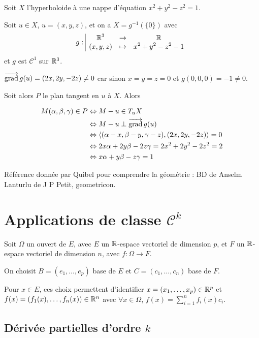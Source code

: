 \begin{exemple}
    Soit $X$ l'hyperboloide à une nappe d'équation $x^2 + y^2 - z^2 = 1$.

    Soit $u \in X$, $u = (x, y, z)$, et on a $X = g^{-1}(\{0\})$ avec 
    $$g: \space \begin{array}{|ccc} \displaystyle \mathbb{R}^3 & \to & \displaystyle \mathbb{R} \\ \displaystyle (x, y, z) & \mapsto & \displaystyle x^2 + y^2 - z^2 - 1 \end{array}$$
    et $g$ est $\mathscr C^1$ sur $\mathbb{R}^3$.

    $\overrightarrow{\operatorname{grad}} \, g (u) = (2x, 2y, -2z) \neq 0$ car sinon $x = y = z = 0$ et $g(0, 0, 0) = -1 \neq 0$.

    Soit alors $P$ le plan tangent en $u$ à $X$. Alors 

    \begin{align}
        M(\alpha, \beta, \gamma) \in P & \Leftrightarrow M - u \in T_uX \\
        & \Leftrightarrow M - u \perp \overrightarrow{\operatorname{grad}} \, g(u) \\
        & \Leftrightarrow \langle (\alpha - x, \beta - y, \gamma - z), (2x, 2y, -2z) \rangle = 0 \\
        & \Leftrightarrow 2x \alpha + 2y \beta - 2z \gamma = 2x^2 + 2y^2 - 2z^2 = 2 \\
        & \Leftrightarrow x \alpha + y \beta - z \gamma = 1
    \end{align}
\end{exemple}

Référence donnée par Quibel pour comprendre la géométrie : BD de Anselm Lanturlu de J P Petit, geometricon. 

\section{Applications de classe \texorpdfstring{$\mathscr C^k $}{Ck}} 

Soit $\Omega$ un ouvert de $E$, avec $E$ un $\mathbb{R}$-espace vectoriel de dimension $p$, 
et $F$ un $\mathbb{R}$-espace vectoriel de dimension $n$, avec $f : \Omega \to F$.

On choisit $B = (e_1, \ldots, e_p)$ base de $E$ et $C = (c_1, \ldots, c_n)$ base de $F$.

Pour $x \in E$, ces choix permettent d'identifier $x = (x_1, \ldots, x_p) \in \mathbb{R}^p$
et $f(x) = (f_1(x), \ldots, f_n(x)) \in \mathbb{R}^n$ avec $\forall x \in \Omega$, 
$f(x) = \sum_{i=1}^n f_i(x) c_i$.

\subsection{Dérivée partielles d'ordre \texorpdfstring{$k$}{k}}

